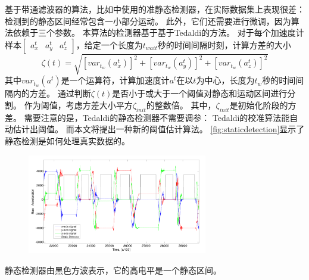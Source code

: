 \documentclass[
  type=master
]{gdutthesis}
\begin{document}
基于带通滤波器的算法，比如\parencite{fong2008methods}中使用的准静态检测器，在实际数据集上表现很差：
检测到的静态区间经常包含一小部分运动。
此外，它们还需要进行微调，因为算法依赖于三个参数。
本算法的检测器基于基于Tedaldi的方法\cite{tedaldi2014robust}。
对于每个加速度计样本$\begin{bmatrix}
	a^t_x & a^t_y & a^t_z
\end{bmatrix}$，给定一个长度为$t_{wait}$秒的时间间隔时刻，计算方差的大小
\begin{equation}\label{eq:var}
	\zeta(t)=\sqrt{[var_{t_w}(a^t_x)]^2+[var_{t_w}(a^t_y)]^2+[var_{t_w}(a^t_z)]^2}
\end{equation}
其中$var_{t_w}(a^t)$是一个运算符，计算加速度计$a^t$在以$t$为中心，长度为$t_w$秒的时间间隔内的方差。
通过判断$\zeta(t)$是否小于或大于一个阈值对静态和运动区间进行分割。
作为阈值，考虑方差大小平方$\zeta_{init}$的整数倍。
其中，$\zeta_{init}$是初始化阶段的方差。
需要注意的是，Tedaldi的静态检测器不需要调参：
Tedaldi的校准算法能自动估计出阈值。
而本文将提出一种新的阈值估计算法。
\autoref{fig:staticdetection}显示了静态检测是如何处理真实数据的。
\begin{figure}[htbp]
	\centering
	\includegraphics[width=0.7\textwidth]{屏幕截图 2022-04-03 103640.png}
	\label{fig:staticdetection}
\end{figure}
静态检测器由黑色方波表示，它的高电平是一个静态区间。
\end{document}
